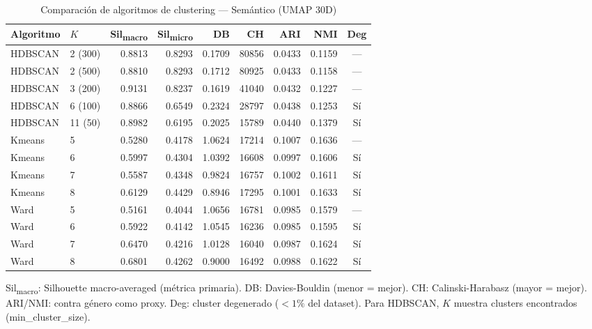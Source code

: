 \begin{table}[htbp]
  \centering
  \small
  \caption{Comparación de algoritmos de clustering --- Semántico (UMAP 30D)}
  \label{tab:clustering_comparison_semantic_umap}
  \begin{tabular}{llrrrrrrc}
    \toprule
    Algoritmo & $K$ & Sil\textsubscript{macro} & Sil\textsubscript{micro} & DB & CH & ARI & NMI & Deg \\
    \midrule
    HDBSCAN & 2 (300) & 0.8813 & 0.8293 & 0.1709 & 80856 & 0.0433 & 0.1159 & --- \\
    HDBSCAN & 2 (500) & 0.8810 & 0.8293 & 0.1712 & 80925 & 0.0433 & 0.1158 & --- \\
    HDBSCAN & 3 (200) & 0.9131 & 0.8237 & 0.1619 & 41040 & 0.0432 & 0.1227 & --- \\
    HDBSCAN & 6 (100) & 0.8866 & 0.6549 & 0.2324 & 28797 & 0.0438 & 0.1253 & Sí \\
    HDBSCAN & 11 (50) & 0.8982 & 0.6195 & 0.2025 & 15789 & 0.0440 & 0.1379 & Sí \\
    Kmeans & 5 & 0.5280 & 0.4178 & 1.0624 & 17214 & 0.1007 & 0.1636 & --- \\
    Kmeans & 6 & 0.5997 & 0.4304 & 1.0392 & 16608 & 0.0997 & 0.1606 & Sí \\
    Kmeans & 7 & 0.5587 & 0.4348 & 0.9824 & 16757 & 0.1002 & 0.1611 & Sí \\
    Kmeans & 8 & 0.6129 & 0.4429 & 0.8946 & 17295 & 0.1001 & 0.1633 & Sí \\
    Ward & 5 & 0.5161 & 0.4044 & 1.0656 & 16781 & 0.0985 & 0.1579 & --- \\
    Ward & 6 & 0.5922 & 0.4142 & 1.0545 & 16236 & 0.0985 & 0.1595 & Sí \\
    Ward & 7 & 0.6470 & 0.4216 & 1.0128 & 16040 & 0.0987 & 0.1624 & Sí \\
    Ward & 8 & 0.6801 & 0.4262 & 0.9000 & 16492 & 0.0988 & 0.1622 & Sí \\
    \bottomrule
  \end{tabular}
  \begin{tablenotes}[flushleft]
    \small
    \item Sil\textsubscript{macro}: Silhouette macro-averaged (métrica primaria). DB: Davies-Bouldin (menor = mejor). CH: Calinski-Harabasz (mayor = mejor). ARI/NMI: contra género como proxy. Deg: cluster degenerado ($<1\%$ del dataset). Para HDBSCAN, $K$ muestra clusters encontrados (min\_cluster\_size).
  \end{tablenotes}
\end{table}